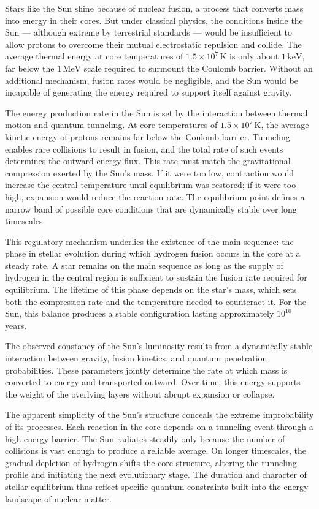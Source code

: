 Stars like the Sun shine because of nuclear fusion, a process that converts mass into energy in their cores. But under classical physics, the conditions inside the Sun — although extreme by terrestrial standards — would be insufficient to allow protons to overcome their mutual electrostatic repulsion and collide. The average thermal energy at core temperatures of $1.5 \times 10^7\,\text{K}$ is only about $1\,\text{keV}$, far below the $1\,\text{MeV}$ scale required to surmount the Coulomb barrier. Without an additional mechanism, fusion rates would be negligible, and the Sun would be incapable of generating the energy required to support itself against gravity.

The energy production rate in the Sun is set by the interaction between thermal motion and quantum tunneling. At core temperatures of $1.5 \times 10^7\,\text{K}$, the average kinetic energy of protons remains far below the Coulomb barrier. Tunneling enables rare collisions to result in fusion, and the total rate of such events determines the outward energy flux. This rate must match the gravitational compression exerted by the Sun's mass. If it were too low, contraction would increase the central temperature until equilibrium was restored; if it were too high, expansion would reduce the reaction rate. The equilibrium point defines a narrow band of possible core conditions that are dynamically stable over long timescales.

This regulatory mechanism underlies the existence of the main sequence: the phase in stellar evolution during which hydrogen fusion occurs in the core at a steady rate. A star remains on the main sequence as long as the supply of hydrogen in the central region is sufficient to sustain the fusion rate required for equilibrium. The lifetime of this phase depends on the star's mass, which sets both the compression rate and the temperature needed to counteract it. For the Sun, this balance produces a stable configuration lasting approximately $10^{10}$ years.

The observed constancy of the Sun's luminosity results from a dynamically stable interaction between gravity, fusion kinetics, and quantum penetration probabilities. These parameters jointly determine the rate at which mass is converted to energy and transported outward. Over time, this energy supports the weight of the overlying layers without abrupt expansion or collapse.

The apparent simplicity of the Sun's structure conceals the extreme improbability of its processes. Each reaction in the core depends on a tunneling event through a high-energy barrier. The Sun radiates steadily only because the number of collisions is vast enough to produce a reliable average. On longer timescales, the gradual depletion of hydrogen shifts the core structure, altering the tunneling profile and initiating the next evolutionary stage. The duration and character of stellar equilibrium thus reflect specific quantum constraints built into the energy landscape of nuclear matter.

